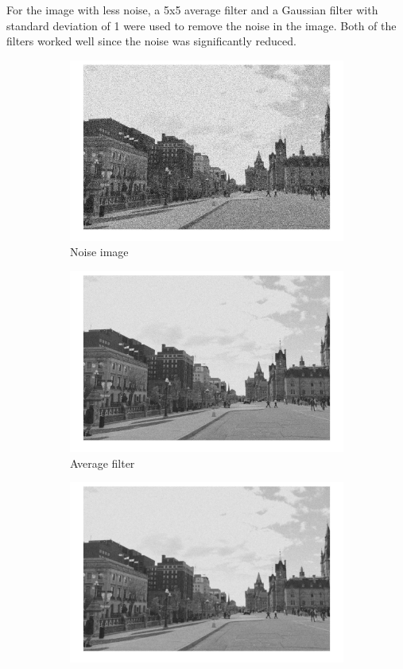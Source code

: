 \documentclass[conference]{IEEEtran}
\begin{document}
For the image with less noise, a 5x5 average filter and a Gaussian filter with standard deviation of 1 were used to remove the noise in the image. Both of the filters worked well since the noise was significantly reduced. 

\begin{figure}[h!]
\centering
\begin{subfigure}[b]{0.3\linewidth}
\includegraphics[width=\linewidth]{images/img16.jpg}
\caption{Noise image}
\end{subfigure}
\begin{subfigure}[b]{0.3\linewidth}
\includegraphics[width=\linewidth]{images/img18.jpg}
\caption{Average filter}
\end{subfigure}
\begin{subfigure}[b]{0.3\linewidth}
\includegraphics[width=\linewidth]{images/img20.jpg}

\end{subfigure}
\end{figure}
\end{document}
